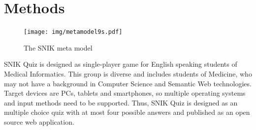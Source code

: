 \documentclass{IOS-Book-Article}     %
\begin{document}

\section{Methods}
\begin{figure}
\caption{The SNIK meta model}
\label{fig:metamodel}
\centering
\texttt{[image: img/metamodel9s.pdf]}
\end{figure}
SNIK Quiz is designed as single-player game for English speaking students of Medical Informatics.
This group is diverse and includes students of Medicine, who may not have a background in Computer Science and Semantic Web technologies.
Target devices are PCs, tablets and smartphones, so multiple operating systems and input methods need to be supported.
Thus, SNIK Quiz is designed as an multiple choice quiz with at most four possible answers and published as an open source web application.
\end{document}
